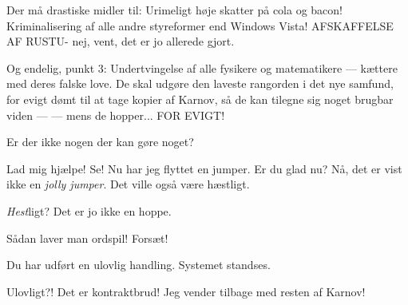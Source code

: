 \documentclass[a4paper,11pt]{article}
\begin{document}
\begin{sketch}
      Der må drastiske midler til:  
      Urimeligt høje skatter på cola og bacon! 
      Kriminalisering af alle andre styreformer end Windows Vista! 
      AFSKAFFELSE AF RUSTU- nej, vent, det er jo allerede gjort. 

      Og endelig, punkt 3: 
      Undertvingelse af alle fysikere og matematikere --- kættere med deres falske love.
      De skal udgøre den laveste rangorden i det nye samfund, for evigt dømt til at tage kopier af Karnov, så de kan tilegne sig noget brugbar viden ---  --- mens de hopper... FOR EVIGT! 
    
    
    	Er der ikke nogen der kan gøre noget?
    

 Lad mig hjælpe!   Se!  Nu har jeg flyttet en jumper.  Er du glad nu?  Nå, det er vist ikke en \emph{jolly jumper}.  Det ville også være hæstligt. 

     \emph{Hest}ligt?  Det er jo ikke en hoppe.

 Sådan laver man ordspil!  Forsæt! 



     Du har udført en ulovlig handling. Systemet standses.

    
     Ulovligt?!  Det er kontraktbrud!  Jeg vender tilbage med resten af Karnov!



\end{sketch}
\end{document}
